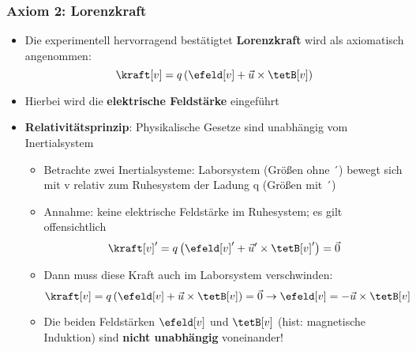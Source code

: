 \begin{frame}
  \frametitle{Axiom 2: Lorenzkraft}
\begin{itemize}[<+->]
\item Die experimentell hervorragend bestätigtet \textbf{Lorenzkraft} wird als axiomatisch angenommen:
  \begin{equation*}
    \kraft[v] = q \left( \efeld[v] + \vec{u} \times \tetB[v] \right)
  \end{equation*}
\item Hierbei wird die \textbf{elektrische Feldstärke} eingeführt
\item \textbf{Relativitätsprinzip}: Physikalische Gesetze sind unabhängig vom Inertialsystem
\begin{itemize}[<+->]
\item Betrachte zwei Inertialsysteme: Laborsystem (Größen ohne ´) bewegt sich mit v   relativ zum Ruhesystem der Ladung q (Größen mit ´)
\item Annahme: keine elektrische Feldstärke im Ruhesystem; es gilt offensichtlich
 \begin{equation*}
    \kraft[v]' = q \left( \efeld[v]' + \vec{u}' \times \tetB[v]' \right) = \vec{0}
  \end{equation*}

\item Dann muss diese Kraft auch im Laborsystem verschwinden:
 \begin{equation*}
    \kraft[v] = q \left( \efeld[v] + \vec{u} \times \tetB[v] \right) = \vec{0} \to \efeld[v] = - \vec{u} \times \tetB[v]
  \end{equation*}
\item Die beiden Feldstärken \(\efeld[v]\) und \(\tetB[v]\) (hist: magnetische Induktion) sind \textbf{nicht unabhängig} voneinander!
\end{itemize}
\end{itemize}
\end{frame}

